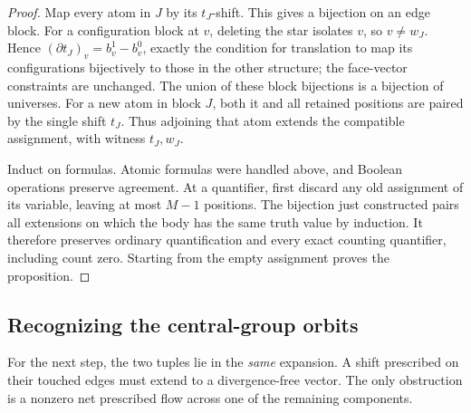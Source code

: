 \begin{proof}
Map every atom in \(J\) by its \(t_J\)-shift.  This gives a bijection on an
edge block.  For a configuration block at \(v\), deleting the star isolates
\(v\), so \(v\ne w_J\).  Hence
\((\partial t_J)_v=b^1_v-b^0_v\), exactly the condition for translation to
map its configurations bijectively to those in the other structure; the
face-vector constraints are unchanged.  The union of these block
bijections is a bijection of universes. For a new atom in block \(J\),
both it and all retained positions are paired by the single shift \(t_J\).
Thus adjoining that atom extends the compatible assignment, with witness
\(t_J,w_J\).

Induct on formulas.  Atomic formulas were handled above, and Boolean
operations preserve agreement.  At a quantifier, first discard any old
assignment of its variable, leaving at most \(M-1\) positions.  The
bijection just constructed pairs all extensions on which the body has the
same truth value by induction.  It therefore preserves ordinary
quantification and every exact counting quantifier, including count zero.
Starting from the empty assignment proves the proposition.
\end{proof}

\subsection{Recognizing the central-group orbits}

For the next step, the two tuples lie in the \emph{same} expansion.  A shift
prescribed on their touched edges must extend to a divergence-free vector.
The only obstruction is a nonzero net prescribed flow across one of the
remaining components.

